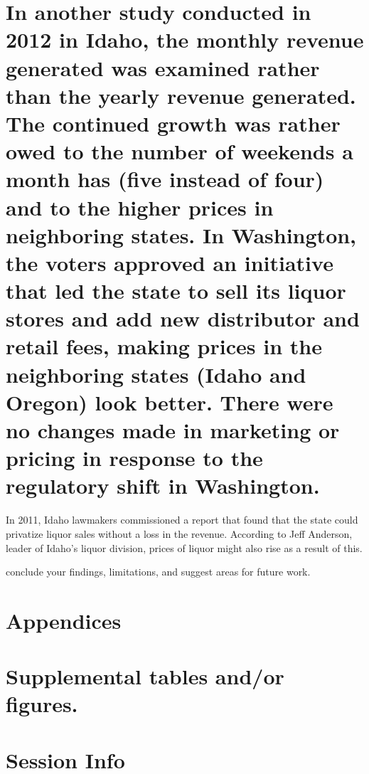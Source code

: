 \documentclass[]{elsarticle} %
\begin{document}
\section{In another study conducted in 2012 in Idaho, the monthly
revenue generated was examined rather than the yearly revenue generated.
The continued growth was rather owed to the number of weekends a month
has (five instead of four) and to the higher prices in neighboring
states. In Washington, the voters approved an initiative that led the
state to sell its liquor stores and add new distributor and retail fees,
making prices in the neighboring states (Idaho and Oregon) look better.
There were no changes made in marketing or pricing in response to the
regulatory shift in
Washington.}\label{in-another-study-conducted-in-2012-in-idaho-the-monthly-revenue-generated-was-examined-rather-than-the-yearly-revenue-generated.-the-continued-growth-was-rather-owed-to-the-number-of-weekends-a-month-has-five-instead-of-four-and-to-the-higher-prices-in-neighboring-states.-in-washington-the-voters-approved-an-initiative-that-led-the-state-to-sell-its-liquor-stores-and-add-new-distributor-and-retail-fees-making-prices-in-the-neighboring-states-idaho-and-oregon-look-better.-there-were-no-changes-made-in-marketing-or-pricing-in-response-to-the-regulatory-shift-in-washington.}

In 2011, Idaho lawmakers commissioned a report that found that the state
could privatize liquor sales without a loss in the revenue. According to
Jeff Anderson, leader of Idaho's liquor division, prices of liquor might
also rise as a result of this.

conclude your findings, limitations, and suggest areas for future work.

\newpage

\section{Appendices}\label{appendices}

\section{Supplemental tables and/or
figures.}\label{supplemental-tables-andor-figures.}

\section{Session Info}\label{session-info}
\end{document}
